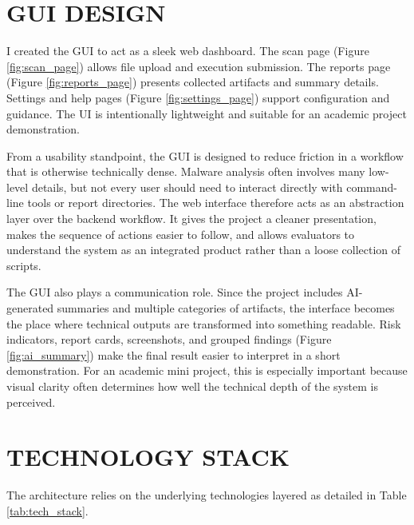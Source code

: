 \documentclass[a4paper,12pt,oneside]{report}
\begin{document}
\section{GUI DESIGN}
I created the GUI to act as a sleek web dashboard. The scan page (Figure \ref{fig:scan_page}) allows file upload and execution submission. The reports page (Figure \ref{fig:reports_page}) presents collected artifacts and summary details. Settings and help pages (Figure \ref{fig:settings_page}) support configuration and guidance. The UI is intentionally lightweight and suitable for an academic project demonstration.

\par

\par

From a usability standpoint, the GUI is designed to reduce friction in a workflow that is otherwise technically dense. Malware analysis often involves many low-level details, but not every user should need to interact directly with command-line tools or report directories. The web interface therefore acts as an abstraction layer over the backend workflow. It gives the project a cleaner presentation, makes the sequence of actions easier to follow, and allows evaluators to understand the system as an integrated product rather than a loose collection of scripts.

\par

\par

The GUI also plays a communication role. Since the project includes AI-generated summaries and multiple categories of artifacts, the interface becomes the place where technical outputs are transformed into something readable. Risk indicators, report cards, screenshots, and grouped findings (Figure \ref{fig:ai_summary}) make the final result easier to interpret in a short demonstration. For an academic mini project, this is especially important because visual clarity often determines how well the technical depth of the system is perceived.
\section{TECHNOLOGY STACK}
The architecture relies on the underlying technologies layered as detailed in Table \ref{tab:tech_stack}.
\end{document}
